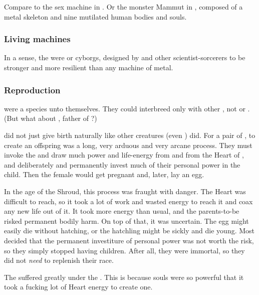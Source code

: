 Compare to the sex machine in \cite{Anime:UrotsukidojiII}. 
Or the monster Mammut in \cite{StevenSavile:CurseoftheNecrarch}, composed of a metal skeleton and nine mutilated human bodies and souls.





\subsubsection{Living machines}
In a sense, the \dragons were  or cyborgs, designed by \Sethicus and other \ophidian scientist-sorcerers to be stronger and more resilient than any machine of metal. 





\subsubsection{Reproduction}
\Dragons were a species unto themselves. 
They could interbreed only with other \dragons, not \quiljaaran or \ophidians.
(But what about \Iurzmacul, father of \Ishnaruchaefir?)

\Dragons did not just give birth naturally like other creatures (even \resphain) did. 
For a pair of \dragons, to create an offspring was a long, very arduous and very arcane process. 
They must invoke the \xss and draw much power and life-energy from \KhothSell and from the Heart of \Miith, and deliberately and permanently invest much of their personal power in the child. 
Then the female would get pregnant and, later, lay an egg. 

In the age of the Shroud, this process was fraught with danger. 
The Heart was difficult to reach, so it took a lot of work and wasted energy to reach it and coax any new life out of it. 
It took more energy than usual, and the \draconic parents-to-be risked permanent bodily harm.
On top of that, it was uncertain. 
The egg might easily die without hatching, or the hatchling might be sickly and die young.
Most \dragons decided that the permanent investiture of personal power was not worth the risk, so they simply stopped having children.
After all, they were immortal, so they did not \emph{need} to replenish their race. 

The \dragons{} suffered greatly under the . 
This is because \draconian{} souls were so powerful that it took a fucking lot of Heart energy to create one. 

